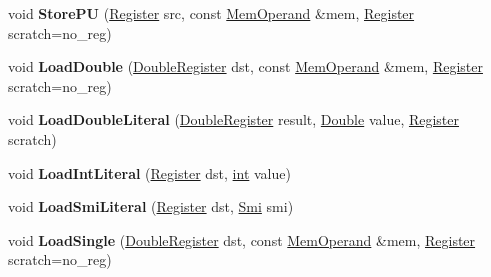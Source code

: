 \begin{DoxyCompactItemize}
\mbox{\label{classv8_1_1internal_1_1TurboAssembler_a9a0aa4ad0852e285a9583cbab9b9e576}} 
void {\bfseries Store\+PU} (\mbox{\hyperlink{classv8_1_1internal_1_1Register}{Register}} src, const \mbox{\hyperlink{classv8_1_1internal_1_1MemOperand}{Mem\+Operand}} \&mem, \mbox{\hyperlink{classv8_1_1internal_1_1Register}{Register}} scratch=no\+\_\+reg)
\item 
\mbox{\label{classv8_1_1internal_1_1TurboAssembler_ae3f1dfa3341f898ac81b7d8bb3dd61e6}} 
void {\bfseries Load\+Double} (\mbox{\hyperlink{classv8_1_1internal_1_1DoubleRegister}{Double\+Register}} dst, const \mbox{\hyperlink{classv8_1_1internal_1_1MemOperand}{Mem\+Operand}} \&mem, \mbox{\hyperlink{classv8_1_1internal_1_1Register}{Register}} scratch=no\+\_\+reg)
\item 
\mbox{\label{classv8_1_1internal_1_1TurboAssembler_a1384081e62baa10a905b5d95b1ec4bbf}} 
void {\bfseries Load\+Double\+Literal} (\mbox{\hyperlink{classv8_1_1internal_1_1DoubleRegister}{Double\+Register}} result, \mbox{\hyperlink{classv8_1_1internal_1_1Double}{Double}} value, \mbox{\hyperlink{classv8_1_1internal_1_1Register}{Register}} scratch)
\item 
\mbox{\label{classv8_1_1internal_1_1TurboAssembler_a5c9e987ef48da30ebf3964f23479b643}} 
void {\bfseries Load\+Int\+Literal} (\mbox{\hyperlink{classv8_1_1internal_1_1Register}{Register}} dst, \mbox{\hyperlink{classint}{int}} value)
\item 
\mbox{\label{classv8_1_1internal_1_1TurboAssembler_aa0b2abed7ecde2ddb1b5781269353d46}} 
void {\bfseries Load\+Smi\+Literal} (\mbox{\hyperlink{classv8_1_1internal_1_1Register}{Register}} dst, \mbox{\hyperlink{classv8_1_1internal_1_1Smi}{Smi}} smi)
\item 
\mbox{\label{classv8_1_1internal_1_1TurboAssembler_a49f688d9498b5a7023d5af290445e5ee}} 
void {\bfseries Load\+Single} (\mbox{\hyperlink{classv8_1_1internal_1_1DoubleRegister}{Double\+Register}} dst, const \mbox{\hyperlink{classv8_1_1internal_1_1MemOperand}{Mem\+Operand}} \&mem, \mbox{\hyperlink{classv8_1_1internal_1_1Register}{Register}} scratch=no\+\_\+reg)

\end{DoxyCompactItemize}

